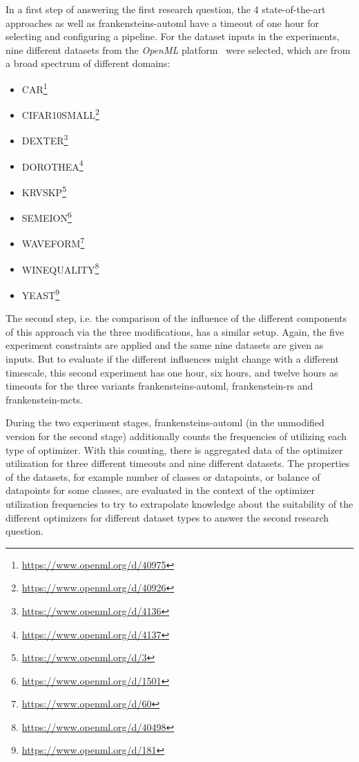 In a first step of answering the first research question, the 4 state-of-the-art approaches as well as frankensteins-automl have a timeout of one hour for selecting and configuring a pipeline.
For the dataset inputs in the experiments, nine different datasets from the \textit{OpenML} platform~\cite{Vanschoren-OpenML} were selected, which are from a broad spectrum of different domains:
\begin{itemize}
    \item CAR\footnote{\url{https://www.openml.org/d/40975}}
    \item CIFAR10SMALL\footnote{\url{https://www.openml.org/d/40926}}
    \item DEXTER\footnote{\url{https://www.openml.org/d/4136}}
    \item DOROTHEA\footnote{\url{https://www.openml.org/d/4137}}
    \item KRVSKP\footnote{\url{https://www.openml.org/d/3}}
    \item SEMEION\footnote{\url{https://www.openml.org/d/1501}}
    \item WAVEFORM\footnote{\url{https://www.openml.org/d/60}}
    \item WINEQUALITY\footnote{\url{https://www.openml.org/d/40498}}
    \item YEAST\footnote{\url{https://www.openml.org/d/181}}
\end{itemize}

The second step, i.e. the comparison of the influence of the different components of this approach via the three modifications, has a similar setup.
Again, the five experiment constraints are applied and the same nine datasets are given as inputs.
But to evaluate if the different influences might change with a different timescale, this second experiment has one hour, six hours, and twelve hours as timeouts for the three variants frankensteins-automl, frankenstein-rs and frankenstein-mcts.

During the two experiment stages, frankensteins-automl (in the unmodified version for the second stage) additionally counts the frequencies of utilizing each type of optimizer.
With this counting, there is aggregated data of the optimizer utilization for three different timeouts and nine different datasets.
The properties of the datasets, for example number of classes or datapoints, or balance of datapoints for some classes, are evaluated in the context of the optimizer utilization frequencies to try to extrapolate knowledge about the suitability of the different optimizers for different dataset types to answer the second research question.

